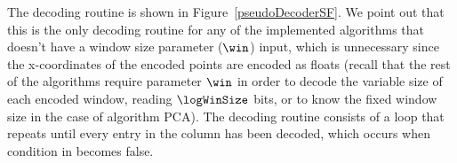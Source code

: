 
\vspace{+10pt}
The decoding routine is shown in Figure~\ref{pseudoDecoderSF}. We point out that this is the only decoding routine for any of the implemented algorithms that doesn't have a window size parameter ($\win$) input, which is unnecessary since the x-coordinates of the encoded points are encoded as floats (recall that the rest of the algorithms require parameter $\win$ in order to decode the variable size of each encoded window, reading $\logWinSize$ bits, or to know the fixed window size in the case of algorithm PCA). The decoding routine consists of a loop that repeats until every entry in the column has been decoded, which occurs when condition in  becomes false. 


